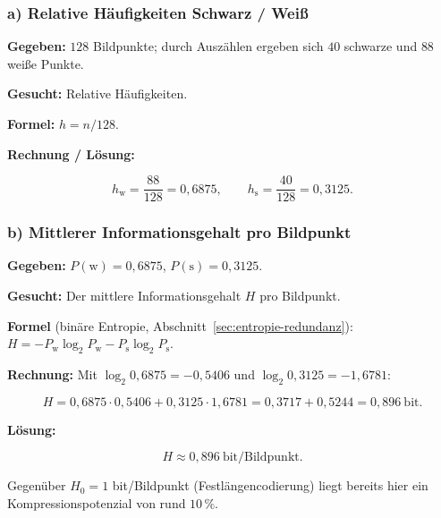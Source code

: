 \subsubsection*{a) Relative Häufigkeiten Schwarz / Weiß}

\begin{beispiel}

\textbf{Gegeben:} $128$ Bildpunkte; durch Auszählen ergeben sich $40$ schwarze
und $88$ weiße Punkte.

\textbf{Gesucht:} Relative Häufigkeiten.

\textbf{Formel:} $h = n/128$.

\textbf{Rechnung / Lösung:}

$$
\boxed{\;h_{\text{w}} = \frac{88}{128} = 0{,}6875, \qquad
h_{\text{s}} = \frac{40}{128} = 0{,}3125.\;}
$$

\end{beispiel}

\subsubsection*{b) Mittlerer Informationsgehalt pro Bildpunkt}

\begin{beispiel}

\textbf{Gegeben:} $P(\text{w}) = 0{,}6875$, $P(\text{s}) = 0{,}3125$.

\textbf{Gesucht:} Der mittlere Informationsgehalt $H$ pro Bildpunkt.

\textbf{Formel} (binäre Entropie, Abschnitt~\ref{sec:entropie-redundanz}):
$H = -P_{\text{w}}\log_2 P_{\text{w}} - P_{\text{s}}\log_2 P_{\text{s}}$.

\textbf{Rechnung:} Mit $\log_2 0{,}6875 = -0{,}5406$ und
$\log_2 0{,}3125 = -1{,}6781$:

$$
H = 0{,}6875\cdot 0{,}5406 + 0{,}3125\cdot 1{,}6781
= 0{,}3717 + 0{,}5244 = 0{,}896\ \text{bit}.
$$

\textbf{Lösung:}

$$
\boxed{\;H \approx 0{,}896\ \text{bit/Bildpunkt}.\;}
$$

Gegenüber $H_0 = 1$ bit/Bildpunkt (Festlängencodierung) liegt bereits hier ein
Kompressionspotenzial von rund $10\,\%$.

\end{beispiel}

